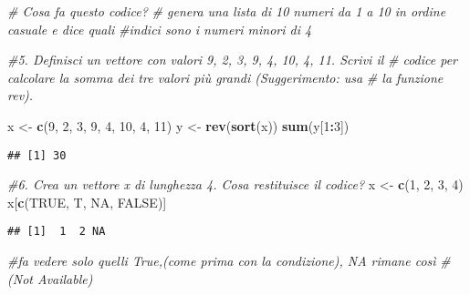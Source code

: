 \documentclass[
]{article}
\newenvironment{Shaded}{\begin{snugshade}}{\end{snugshade}}
\newcommand{\CommentTok}[1]{\textcolor[rgb]{0.56,0.35,0.01}{\textit{#1}}}
\newcommand{\ConstantTok}[1]{\textcolor[rgb]{0.56,0.35,0.01}{#1}}
\newcommand{\DecValTok}[1]{\textcolor[rgb]{0.00,0.00,0.81}{#1}}
\newcommand{\FunctionTok}[1]{\textcolor[rgb]{0.13,0.29,0.53}{\textbf{#1}}}
\newcommand{\NormalTok}[1]{#1}
\newcommand{\OtherTok}[1]{\textcolor[rgb]{0.56,0.35,0.01}{#1}}
\newcommand{\SpecialCharTok}[1]{\textcolor[rgb]{0.81,0.36,0.00}{\textbf{#1}}}
\begin{document}
\begin{Shaded}
\begin{Highlighting}[]
\CommentTok{\#   Cosa fa questo codice?}
\CommentTok{\# genera una lista di 10 numeri da 1 a 10 in ordine casuale e dice quali}
\CommentTok{\#indici sono i numeri minori di 4}

\CommentTok{\#5. Definisci un vettore con valori 9, 2, 3, 9, 4, 10, 4, 11. Scrivi il}
\CommentTok{\# codice per calcolare la somma dei tre valori più grandi (Suggerimento: usa}
\CommentTok{\# la funzione rev).}

\NormalTok{x }\OtherTok{\textless{}{-}} \FunctionTok{c}\NormalTok{(}\DecValTok{9}\NormalTok{, }\DecValTok{2}\NormalTok{, }\DecValTok{3}\NormalTok{, }\DecValTok{9}\NormalTok{, }\DecValTok{4}\NormalTok{, }\DecValTok{10}\NormalTok{, }\DecValTok{4}\NormalTok{, }\DecValTok{11}\NormalTok{)}
\NormalTok{y }\OtherTok{\textless{}{-}} \FunctionTok{rev}\NormalTok{(}\FunctionTok{sort}\NormalTok{(x))}
\FunctionTok{sum}\NormalTok{(y[}\DecValTok{1}\SpecialCharTok{:}\DecValTok{3}\NormalTok{])}
\end{Highlighting}
\end{Shaded}

\begin{verbatim}
## [1] 30
\end{verbatim}

\begin{Shaded}
\begin{Highlighting}[]
\CommentTok{\#6. Crea un vettore x di lunghezza 4. Cosa restituisce il codice?}
\NormalTok{x }\OtherTok{\textless{}{-}} \FunctionTok{c}\NormalTok{(}\DecValTok{1}\NormalTok{, }\DecValTok{2}\NormalTok{, }\DecValTok{3}\NormalTok{, }\DecValTok{4}\NormalTok{)}
\NormalTok{x[}\FunctionTok{c}\NormalTok{(}\ConstantTok{TRUE}\NormalTok{, T, }\ConstantTok{NA}\NormalTok{, }\ConstantTok{FALSE}\NormalTok{)]}
\end{Highlighting}
\end{Shaded}

\begin{verbatim}
## [1]  1  2 NA
\end{verbatim}

\begin{Shaded}
\begin{Highlighting}[]
\CommentTok{\#fa vedere solo quelli True,(come prima con la condizione), NA rimane così }
\CommentTok{\#(Not Available)}
\end{Highlighting}
\end{Shaded}
\end{document}
